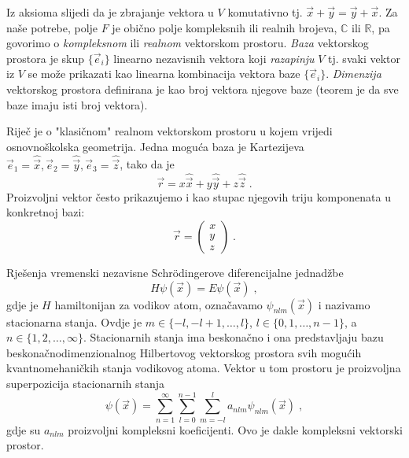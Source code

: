 Iz aksioma slijedi da je zbrajanje vektora u $V$  komutativno tj.
 $\vec{x} + \vec{y} = \vec{y} + \vec{x} $.
Za naše potrebe, polje $F$ je obično polje kompleksnih ili 
realnih brojeva, $\mathbb{C}$ ili $\mathbb{R}$, pa govorimo o
 \emph{kompleksnom} ili \emph{realnom} vektorskom prostoru.
\emph{Baza} vektorskog prostora je skup $\{\vec{e}_{i}\}$ linearno nezavisnih vektora koji 
\emph{razapinju} $V$ tj. svaki vektor iz $V$ se može prikazati kao linearna
 kombinacija vektora baze $\{\vec{e}_{i}\}$.
\emph{Dimenzija} vektorskog prostora definirana je kao broj vektora njegove baze (teorem
je da sve baze imaju isti broj vektora).

\begin{primjer}
Riječ je o "klasičnom" realnom vektorskom prostoru u kojem vrijedi osnovnoškolska
geometrija. Jedna moguća baza je Kartezijeva
$\vec{e}_{1}=\hat{\vec{x}}, \vec{e}_{2}=\hat{\vec{y}}, 
   \vec{e}_{3}=\hat{\vec{z}}$, tako da je
\begin{equation}
    \vec{r} = x \hat{\vec{x}} + y \hat{\vec{y}} + z \hat{\vec{z}} \;.
\end{equation}
Proizvoljni vektor često prikazujemo i kao stupac njegovih triju komponenata
u konkretnoj bazi:
\begin{equation}
\vec{r}= \left(
\begin{array}{c}
x \\
y \\
z
\end{array} \right) \;.
\end{equation}
\end{primjer}

\begin{primjer}

Rješenja vremenski nezavisne Schr\"{o}dingerove diferencijalne jednadžbe 
\begin{equation}
H\psi(\vec{x})=E\psi(\vec{x}) \;,
\end{equation}
gdje je $H$ hamiltonijan za vodikov atom, označavamo 
$\psi_{nlm}(\vec{x})$ i nazivamo stacionarna stanja. Ovdje je
$m \in \{-l, -l+1, \ldots, l\}$, $l \in \{0, 1, \ldots, n-1\}$,
a $n \in \{1, 2, \ldots, \infty\}$. Stacionarnih stanja ima
beskonačno i ona predstavljaju
bazu beskonačnodimenzionalnog Hilbertovog vektorskog prostora
svih mogućih kvantnomehaničkih stanja vodikovog atoma.
Vektor u tom prostoru je proizvoljna superpozicija stacionarnih
stanja
\begin{equation}
       \psi(\vec{x})=\sum_{n=1}^{\infty}\sum_{l=0}^{n-1}
  \sum_{m=-l}^{l}  a_{nlm}  \psi_{nlm}(\vec{x}) \;,
\end{equation}
gdje su $a_{nlm}$ proizvoljni kompleksni koeficijenti. Ovo je dakle
kompleksni vektorski prostor.

\end{primjer}


